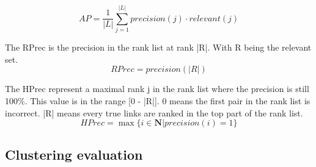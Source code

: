 \begin{definition}

  \begin{equation}
    AP = \frac{1}{|L|} \sum_{j=1}^{|L|} precision(j) \cdot relevant(j)
  \end{equation}
\end{definition}

\begin{definition}[RPrec]
  The RPrec is the precision in the rank list at rank |R|.
  With R being the relevant set.
  \begin{equation}
    RPrec = precision(|R|)
  \end{equation}
\end{definition}

\begin{definition}[HPrec]
  The HPrec represent a maximal rank j in the rank list where the precision is still 100\%.
  This value is in the range [0 - |R|].
  0 means the first pair in the rank list is incorrect.
  |R| means every true links are ranked in the top part of the rank list.
  \begin{equation}
    HPrec = \max\{i \in \mathbf{N} | precision(i) = 1\}
  \end{equation}
\end{definition}

\subsection{Clustering evaluation}

\begin{definition}

  \begin{equation}
  \end{equation}
\end{definition}

\begin{definition}

  \begin{equation}
  \end{equation}
\end{definition}

\begin{definition}

  \begin{equation}
  \end{equation}
\end{definition}
